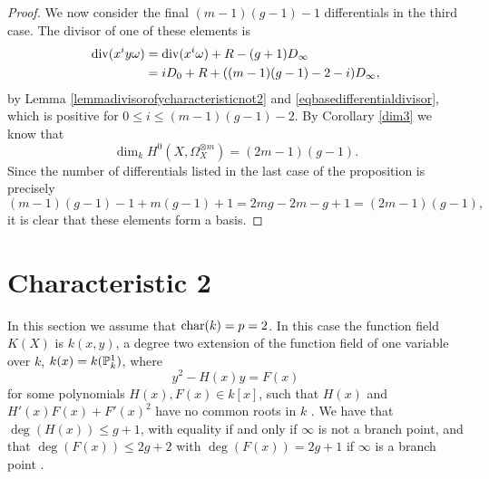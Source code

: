 \begin{proof}
    
    
    We now consider the final $(m-1)(g-1) - 1$ differentials in the third case.
    The divisor of one of these elements is
        \begin{align*}
        \operatorname{div} (x^iy\omega) & =  \operatorname{div}(x^i\omega) + R -(g+1)D_\infty \\
        & =  iD_0 + R +((m-1)(g-1)-2-i)D_\infty,
        \end{align*}
    by Lemma \ref{lemmadivisorofycharacteristicnot2} and \eqref{eqbasedifferentialdivisor}, which is positive for $0\leq i \leq (m-1)(g-1)-2$.
    By Corollary \ref{dim3} we know that 
        \[
        \dim_kH^0(X,\Omega_X^{\otimes m}) = (2m-1)(g-1).
        \]
    Since the number of differentials listed in the last case of the proposition is precisely
        \[
        (m-1)(g-1)-1 + m(g-1) +1 = 2mg -2m -g + 1 = (2m-1)(g-1),
        \]
    it is clear that these elements form a basis.
    \end{proof}


\section{Characteristic 2}

In this section we assume that $\operatorname{char}(k) = p  =2$.   
In this case the function field $K(X)$ is $k(x,y)$, a degree two extension of the function field of one variable over $k$, $k(x) = k({\mathbb P}_k^1)$, where
    \begin{equation}\label{ext}
    y^2 - H(x)y = F(x)
    \end{equation}
for some polynomials $H(x), F(x)\in k[x]$, such that $H(x)$ and $H'(x)F(x) + F'(x)^2$ have no common roots in $k$ \cite[Prop.\ 7.4.24]{liu}.
We have that $\deg(H(x)) \leq g+1$, with equality if and only if $\infty$ is not a branch point, and that $\deg(F(x)) \leq 2g+2$ with $\deg(F(x)) = 2g+1$ if $\infty$ is a branch point  \cite[Prop.\ 7.4.24]{liu}.

